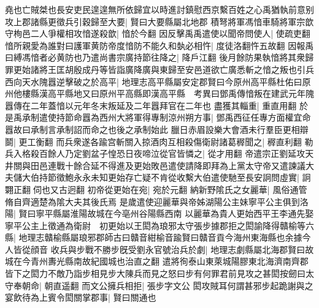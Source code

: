 堯也亡賊桀也長安吏民遑遑無所依歸宜以時進討鎮慰西京繫百姓之心禹猶執前意别攻上郡諸縣更徵兵引穀歸至大要|{
	賢曰大要縣屬北地郡}
積弩將軍馮愔車騎將軍宗歆守栒邑二人爭權相攻愔遂殺歆|{
	愔於今翻}
因反擊禹禹遣使以聞帝問使人|{
	使疏吏翻}
愔所親愛為誰對曰護軍黄防帝度愔防不能久和埶必相忤|{
	度徒洛翻忤五故翻}
因報禹曰縛馮愔者必黄防也乃遣尚書宗廣持節往降之|{
	降戶江翻}
後月餘防果執愔將其衆歸罪更始諸將王匡胡殷成丹等皆詣廣降廣與東歸至安邑道欲亡廣悉斬之愔之叛也引兵西向天水隗囂逆擊破之於高平|{
	地理志高平縣屬安定郡賢曰今原州高平縣杜佑曰原州他樓縣漢高平縣地又曰原州平高縣即漢高平縣　考異曰鄧禹傳愔叛在建武元年隗囂傳在二年蓋愔以元年冬末叛延及二年囂拜官在二年也}
盡獲其輜重|{
	重直用翻}
於是禹承制遣使持節命囂為西州大將軍得專制涼州朔方事|{
	鄧禹西征任專方面權宜命囂故曰承制言承制詔而命之也後之承制始此}
臘日赤眉設樂大會酒未行羣臣更相辯鬬|{
	更工衡翻}
而兵衆遂各踰宫斬關入掠酒肉互相殺傷衛尉諸葛稺聞之|{
	稺直利翻}
勒兵入格殺百餘人乃定劉盆子惶恐日夜啼泣從官皆憐之|{
	從才用翻}
帝遣宗正劉延攻天井關與田邑連戰十餘合延不得進及更始敗邑遣使請降即拜為上黨太守帝又遣諫議大夫儲大伯持節徵鮑永永未知更始存亡疑不肯從收繫大伯遣使馳至長安詗問虛實|{
	詗翾正翻伺也又古迥翻}
初帝從更始在宛|{
	宛於元翻}
納新野隂氏之女麗華|{
	風俗通管脩自齊適楚為隂大夫其後氏焉}
是歲遣使迎麗華與帝姊湖陽公主妹寧平公主俱到洛陽|{
	賢曰寧平縣屬淮陽故城在今亳州谷陽縣西南}
以麗華為貴人更始西平王李通先娶寧平公主上徵通為衛尉　初更始以王閎為琅邪太守張步據郡拒之閎諭降得贛榆等六縣|{
	地理志贛榆縣屬琅邪郡師古曰贛音紺榆音踰賢曰贛音貢今海州東海縣也余據今人皆從顔音}
收兵與步戰不勝步旣受劉永官號治兵於劇|{
	地理志劇縣屬北海郡賢曰故城在今青州夀光縣南故紀國城也治直之翻}
遣將徇泰山東萊城陽膠東北海濟南齊郡皆下之閎力不敵乃詣步相見步大陳兵而見之怒曰步有何罪君前見攻之甚閎按劒曰太守奉朝命|{
	朝直遥翻}
而文公擁兵相拒|{
	張步字文公}
閎攻賊耳何謂甚邪步起跪謝與之宴飲待為上賓令閎關掌郡事|{
	賢曰關通也}


